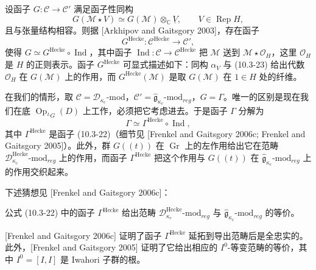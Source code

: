 设函子 $G:\mathcal{C}\to\mathcal{C}'$ 满足函子性同构
\begin{equation}
    G(\mathcal{M}\star V)\simeq G(\mathcal{M})\otimes_{\mathbb{C}}\underline{V},
    \qquad V\in\operatorname{Rep}H,
    \tag{10.3-23}
\end{equation}
且与张量结构相容。则据 [Arkhipov and Gaitsgory 2003]，存在函子
\[
    G^{\text{Hecke}}:\mathcal{C}^{\text{Hecke}}\to\mathcal{C}',
\]
使得 $G\simeq G^{\text{Hecke}}\circ\operatorname{Ind}$，其中函子 $\operatorname{Ind}:\mathcal{C}\to\mathcal{C}^{\text{Hecke}}$ 把 $\mathcal{M}$ 送到 $\mathcal{M}\star\mathcal{O}_H$，这里 $\mathcal{O}_H$ 是 $H$ 的正则表示。函子 $G^{\text{Hecke}}$ 可显式描述如下：同构 $\alpha_V$ 与 (10.3-23) 给出代数 $\mathcal{O}_H$ 在 $G(\mathcal{M})$ 上的作用，而 $G^{\text{Hecke}}(\mathcal{M})$ 是取 $G(\mathcal{M})$ 在 $1\in H$ 处的纤维。

在我们的情形，取 $\mathcal{C}=\mathcal{D}_{\kappa_c}\text{-mod}$，$\mathcal{C}'=\hat{\mathfrak{g}}_{\kappa_c}\text{-mod}_{reg}$，$G=\Gamma$。唯一的区别是现在我们在底 $\operatorname{Op}_{{}^LG}(D)$ 上工作，必须把它考虑进去。于是函子 $\Gamma$ 分解为
\[
    \Gamma\simeq\Gamma^{\text{Hecke}}\circ\operatorname{Ind},
\]
其中 $\Gamma^{\text{Hecke}}$ 是函子 (10.3-22)（细节见 [Frenkel and Gaitsgory 2006c; Frenkel and Gaitsgory 2005]）。此外，群 $G((t))$ 在 $\operatorname{Gr}$ 上的左作用给出它在范畴 $\mathcal{D}^{\text{Hecke}}_{\kappa_c}\text{-mod}_{reg}$ 上的作用，而函子 $\Gamma^{\text{Hecke}}$ 把这个作用与 $G((t))$ 在 $\hat{\mathfrak{g}}_{\kappa_c}\text{-mod}_{reg}$ 上的作用交织起来。


下述猜想见 [Frenkel and Gaitsgory 2006c]：

\begin{conjecture}
    公式 (10.3-22) 中的函子 $\Gamma^{\text{Hecke}}$ 给出范畴 $\mathcal{D}^{\text{Hecke}}_{\kappa_c}\text{-mod}_{reg}$ 与 $\hat{\mathfrak{g}}_{\kappa_c}\text{-mod}_{reg}$ 的等价。
\end{conjecture}

[Frenkel and Gaitsgory 2006c] 证明了函子 $\Gamma^{\text{Hecke}}$ 延拓到导出范畴后是全忠实的。此外，[Frenkel and Gaitsgory 2005] 证明了它给出相应的 $I^0$-等变范畴的等价，其中 $I^0=[I,I]$ 是 Iwahori 子群的根。

